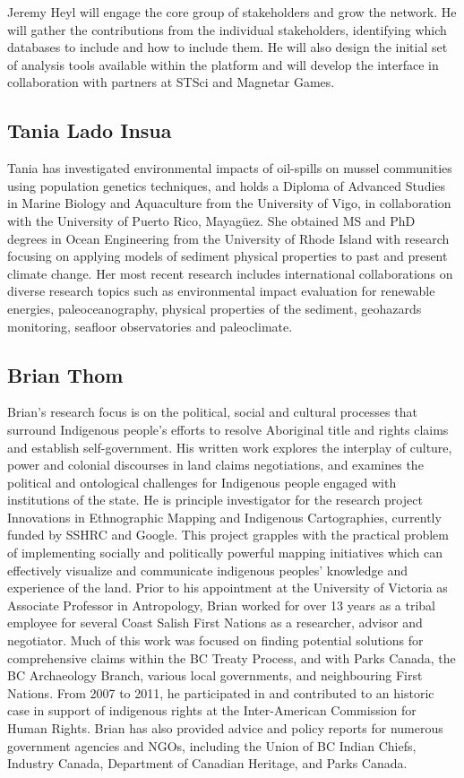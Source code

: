 Jeremy Heyl will engage the core group of stakeholders and grow the
network.  He will gather the contributions from the individual
stakeholders, identifying which databases to include and how to
include them.  He will also design the initial set of analysis tools
available within the platform and will develop the interface in
collaboration with partners at STSci and Magnetar Games.

\subsection*{Tania Lado Insua}

Tania has investigated environmental impacts of oil-spills on mussel
communities using population genetics techniques, and holds a Diploma
of Advanced Studies in Marine Biology and Aquaculture from the
University of Vigo, in collaboration with the University of Puerto
Rico, Mayagüez.  She obtained MS and PhD degrees in Ocean Engineering
from the University of Rhode Island with research focusing on applying
models of sediment physical properties to past and present climate
change. Her most recent research includes international collaborations
on diverse research topics such as environmental impact evaluation for
renewable energies, paleoceanography, physical properties of the
sediment, geohazards monitoring, seafloor observatories and
paleoclimate.


\subsection*{Brian Thom}

Brian’s research focus is on the political, social and cultural
processes that surround Indigenous people's efforts to resolve
Aboriginal title and rights claims and establish self-government.  His
written work explores the interplay of culture, power and colonial
discourses in land claims negotiations, and examines the political and
ontological challenges for Indigenous people engaged with institutions
of the state.  He is principle investigator for the research project
Innovations in Ethnographic Mapping and Indigenous Cartographies,
currently funded by SSHRC and Google. This project grapples with the
practical problem of implementing socially and politically powerful
mapping initiatives which can effectively visualize and communicate
indigenous peoples’ knowledge and experience of the land.
Prior to his appointment at the University of Victoria as Associate
Professor in Antropology, Brian worked for over 13 years as a tribal
employee for several Coast Salish First Nations as a researcher, advisor
and negotiator. Much of this work was focused on finding potential solutions
for comprehensive claims within the BC Treaty Process, and with Parks Canada,
the BC Archaeology Branch, various local governments, and neighbouring First
Nations.  From 2007 to 2011, he participated in and contributed to an
historic case in support of indigenous rights at the Inter-American
Commission for Human Rights.  Brian has also provided advice and policy
reports for numerous government agencies and NGOs, including the Union of
BC Indian Chiefs, Industry Canada, Department of Canadian Heritage, and
Parks Canada. 




